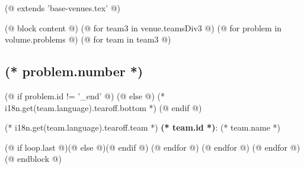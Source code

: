 (@ extends 'base-venues.tex' @)

(@ block content @)
    \pagestyle{tearoff}    
    (@ for team3 in venue.teamsDiv3 @)
        (@ for problem in volume.problems @)
            (@ for team in team3 @)%
                \setcounter{volume}{(* volume.number *)}%
                \setcounter{problem}{(* problem.number *)}%
                \setcounter{team}{(* team.id *)}%

                \begin{minipage}[t][96mm][t]{\textwidth}%
                    \begin{minipage}[t][88mm][t]{0.85\linewidth}%
                        \vspace{0pt}%
                        \subsection{\texorpdfstring{(* problem.number *)}{(* problem.number *). (* problem.id *)}}%
                        \setlength{\parskip}{6pt}
                        (@ if problem.id != '_end' @)
                        (@ else @)
                            (* i18n.get(team.language).tearoff.bottom *)
                        (@ endif @)
                    \end{minipage}%
                    \begin{minipage}[t][88mm][t]{0.15\linewidth}
                        \vspace{0mm}%
                        \hspace{4mm}%
                        \hspace{2pt}
                    \end{minipage}
                    {\small (* i18n.get(team.language).tearoff.team *) \textbf{(* team.id *)}: (* team.name *)}
                \end{minipage}%
                (@ if loop.last @)\newpage(@ else @)\vspace*{-1mm}(@ endif @)
            (@ endfor @)
        (@ endfor @)
    (@ endfor @)
(@ endblock @)
